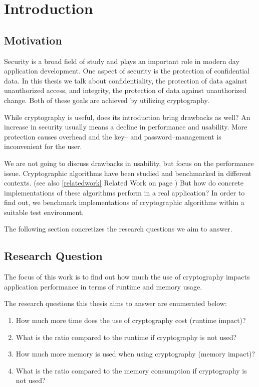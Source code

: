\chapter{Introduction}

\section{Motivation}

Security is a broad field of study and plays an important role in modern day application development.
One aspect of security is the protection of confidential data.
In this thesis we talk about confidentiality, the protection of data against unauthorized access, and integrity, the protection of data against unauthorized change.
Both of these goals are achieved by utilizing cryptography.

While cryptography is useful, does its introduction bring drawbacks as well?
An increase in security usually means a decline in performance and usability.
More protection causes overhead and the key-- and password--management is inconvenient for the user.

We are not going to discuss drawbacks in usability, but focus on the performance issue.
Cryptographic algorithms have been studied and benchmarked in different contexts.\cite{thakur2011aes,Gupta:2002:PAE:570681.570691} (see also \ref{relatedwork} Related Work on page \pageref{relatedwork})
But how do concrete implementations of these algorithms perform in a real application?
In order to find out, we benchmark implementations of cryptographic algorithms within a suitable test environment.

The following section concretizes the research questions we aim to answer.

\section{Research Question}

The focus of this work is to find out how much the use of cryptography
impacts application performance in terms of runtime and memory
usage.

The research questions this thesis aims to answer are enumerated below:

\begin{enumerate}
\def\labelenumi{\arabic{enumi}.}
\tightlist
\item
  How much more time does the use of cryptography cost (runtime impact)?
\item
  What is the ratio compared to the runtime if cryptography is not used?
\item
  How much more memory is used when using cryptography (memory impact)?
\item
  What is the ratio compared to the memory consumption if cryptography
  is not used?
\end{enumerate}

